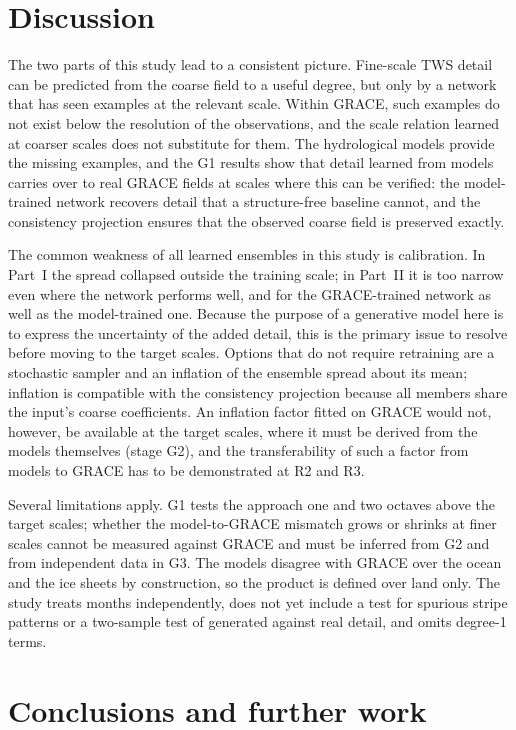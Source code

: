 \documentclass[11pt,a4paper]{article}
\begin{document}
\section{Discussion}

The two parts of this study lead to a consistent picture. Fine-scale TWS detail can be predicted
from the coarse field to a useful degree, but only by a network that has seen examples at the
relevant scale. Within GRACE, such examples do not exist below the resolution of the
observations, and the scale relation learned at coarser scales does not substitute for them. The
hydrological models provide the missing examples, and the G1 results show that detail learned
from models carries over to real GRACE fields at scales where this can be verified: the
model-trained network recovers detail that a structure-free baseline cannot, and the
consistency projection ensures that the observed coarse field is preserved exactly.

The common weakness of all learned ensembles in this study is calibration. In Part~I the
spread collapsed outside the training scale; in Part~II it is too narrow even where the network
performs well, and for the GRACE-trained network as well as the model-trained one. Because the
purpose of a generative model here is to express the uncertainty of the added detail, this is
the primary issue to resolve before moving to the target scales. Options that do not require
retraining are a stochastic sampler and an inflation of the ensemble spread about its mean;
inflation is compatible with the consistency projection because all members share the input's
coarse coefficients. An inflation factor fitted on GRACE would not, however, be available at
the target scales, where it must be derived from the models themselves (stage G2), and the
transferability of such a factor from models to GRACE has to be demonstrated at R2 and R3.

Several limitations apply. G1 tests the approach one and two octaves above the target scales;
whether the model-to-GRACE mismatch grows or shrinks at finer scales cannot be measured against
GRACE and must be inferred from G2 and from independent data in G3. The models disagree with
GRACE over the ocean and the ice sheets by construction, so the product is defined over land
only. The study treats months independently, does not yet include a test for spurious stripe
patterns or a two-sample test of generated against real detail, and omits degree-1 terms.

\section{Conclusions and further work}
\end{document}
